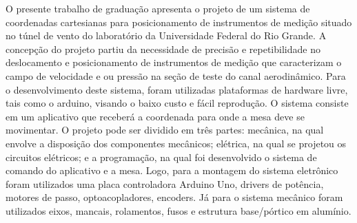 O presente trabalho de graduação apresenta o projeto de um sistema de coordenadas cartesianas para 
posicionamento de instrumentos de medição situado no túnel de vento do laboratório da Universidade 
Federal do Rio Grande. A concepção do projeto partiu da necessidade de precisão e repetibilidade  
no deslocamento  e posicionamento de instrumentos de medição  que caracterizam  o campo de velocidade 
e ou pressão na seção de teste do canal aerodinâmico. Para o desenvolvimento deste sistema, foram 
utilizadas plataformas de hardware livre, tais como o arduino, visando o baixo custo e fácil 
reprodução. O sistema consiste em um aplicativo que receberá a coordenada para onde a mesa deve 
se movimentar. O projeto pode ser dividido em três partes: mecânica, na qual envolve a disposição 
dos componentes mecânicos; elétrica, na qual se projetou os circuitos elétricos; e a programação, 
na qual foi desenvolvido o sistema de comando do aplicativo e a mesa. Logo, para a montagem do sistema 
eletrônico foram utilizados uma placa controladora  Arduino Uno, drivers de potência, motores de passo, 
optoacopladores, encoders. Já para o sistema mecânico foram utilizados eixos, mancais, rolamentos, 
fusos e estrutura base/pórtico em alumínio.

